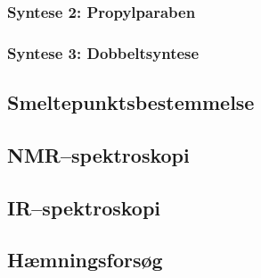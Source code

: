    \subsubsection{Syntese 2: Propylparaben}
    

    \subsubsection{Syntese 3: Dobbeltsyntese}
        

    \subsection{Smeltepunktsbestemmelse}
    

    \subsection{NMR--spektroskopi}
    

    \subsection{IR--spektroskopi}
    

    \subsection{Hæmningsforsøg}
    

